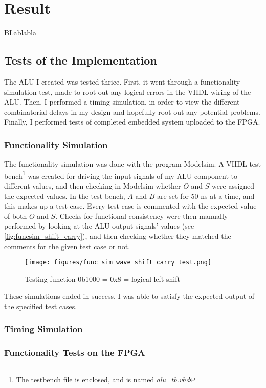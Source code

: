 \documentclass{article}
\begin{document}
\section{Result}
\label{sec:result}
BLablabla
\subsection{Tests of the Implementation}
\label{subsec:tests}
The ALU I created was tested thrice. First, it went through a functionality simulation test, made to root out any logical errors in the VHDL wiring of the ALU. Then, I performed a timing simulation, in order to view the different combinatorial delays in my design and hopefully root out any potential problems. Finally, I performed tests of completed embedded system uploaded to the FPGA. 
\subsubsection{Functionality Simulation}
\label{subsubsec:funcsim}
The functionality simulation was done with the program Modelsim. A VHDL test bench\footnote{The testbench file is enclosed, and is named \emph{alu\_tb.vhd}} was created for driving the input signals of my ALU component to different values, and then checking in Modelsim whether $O$ and $S$ were assigned the expected values. In the test bench, $A$ and $B$ are set for 50 ns at a time, and this makes up a test case. Every test case is commented with the expected value of both $O$ and $S$. Checks for functional consistency were then manually performed by looking at the ALU output signals' values (see \autoref{fig:funcsim_shift_carry}), and then checking whether they matched the comments for the given test case or not. 
\begin{figure}[htbp]
  \centering
  \texttt{[image: figures/func\_sim\_wave\_shift\_carry\_test.png]}
  \caption{\label{fig:funcsim_shift_carry} Testing function 0b1000 = 0x8 = logical left shift}
\end{figure}

These simulations ended in success. I was able to satisfy the expected output of the specified test cases.

\subsubsection{Timing Simulation}
\label{subsubsec:timingsim}

\subsubsection{Functionality Tests on the FPGA}
\label{subsubsec:funcfpga}
\end{document}
